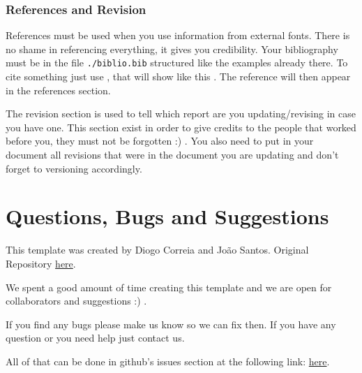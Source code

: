 \documentclass[]{engenius}
\begin{document}
\subsubsection{References and Revision}

References must be used when you use information from external fonts. There is no shame in referencing everything, it gives you credibility. Your bibliography must be in the file \texttt{./biblio.bib} structured like the examples already there. To cite something just use \texttt{\cite{name}}, that will show like this \cite{einstein}. The reference will then appear in the references section.

The revision section is used to tell which report are you updating/revising in case you have one. This section exist in order to give credits to the people that worked before you, they must not be forgotten :) . You also need to put in your document all revisions that were in the document you are updating and don't forget to versioning accordingly.

\section{Questions, Bugs and Suggestions}

This template was created by Diogo Correia and João Santos.
Original Repository \textcolor{blue}{\href{https://github.com/dvcorreia/engenius-ua-latex-template}{here}}.

We spent a good amount of time creating this template and we are open for collaborators and suggestions :) .

If you find any bugs please make us know so we can fix then.
If you have any question or you need help just contact us.

All of that can be done in github's issues section at the following link:  \textcolor{blue}{\href{https://github.com/dvcorreia/engenius-ua-latex-template/issues/new}{here}}.



\revisions
{}
\end{document}
